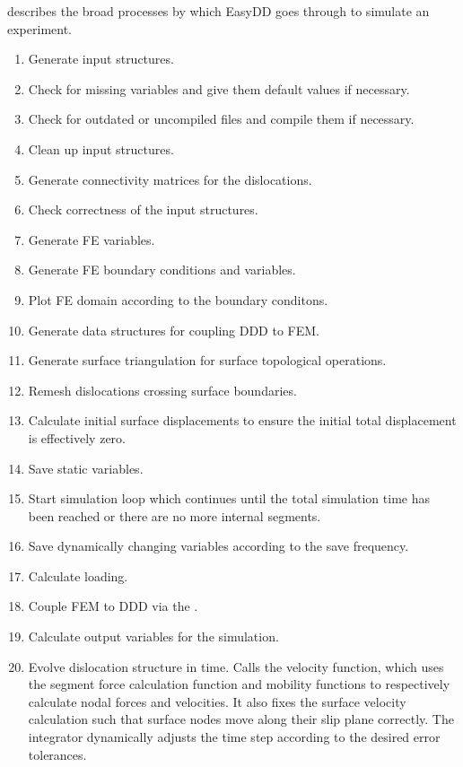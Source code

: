  describes the broad processes by which EasyDD goes through to simulate an experiment.
\begin{center}
    \label{alg:EasyDD}
    \begin{enumerate}
        \item Generate input structures.
        \item Check for missing variables and give them default values if necessary.
        \item Check for outdated or uncompiled files and compile them if necessary.
        \item Clean up input structures.
        \item Generate connectivity matrices for the dislocations.
        \item Check correctness of the input structures.
        \item Generate FE variables.
        \item Generate FE boundary conditions and variables.
        \item Plot FE domain according to the boundary conditons.
        \item Generate data structures for coupling DDD to FEM.
        \item Generate surface triangulation for surface topological operations.
        \item Remesh dislocations crossing surface boundaries.
        \item Calculate initial surface displacements to ensure the initial total displacement is effectively zero.
        \item Save static variables.
        \item Start simulation loop which continues until the total simulation time has been reached or there are no more internal segments.
        \item Save dynamically changing variables according to the save frequency.
        \item Calculate loading.
        \item Couple FEM to DDD via the .
        \item Calculate output variables for the simulation.
        \item Evolve dislocation structure in time. Calls the velocity function, which uses the segment force calculation function and mobility functions to respectively calculate nodal forces and velocities. It also fixes the surface velocity calculation such that surface nodes move along their slip plane correctly. The integrator dynamically adjusts the time step according to the desired error tolerances.

\end{enumerate}
\end{center}
